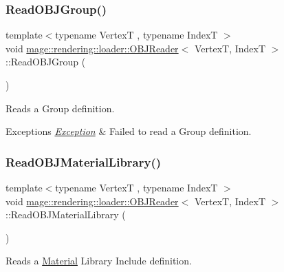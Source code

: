 \subsubsection{\texorpdfstring{Read\+O\+B\+J\+Group()}{ReadOBJGroup()}}
{\footnotesize\ttfamily template$<$typename VertexT , typename IndexT $>$ \\
void \mbox{\hyperlink{classmage_1_1rendering_1_1loader_1_1_o_b_j_reader}{mage\+::rendering\+::loader\+::\+O\+B\+J\+Reader}}$<$ VertexT, IndexT $>$\+::Read\+O\+B\+J\+Group (\begin{DoxyParamCaption}{ }\end{DoxyParamCaption})\hspace{0.3cm}{\ttfamily [private]}}

Reads a Group definition.


\begin{DoxyExceptions}{Exceptions}
{\em \mbox{\hyperlink{classmage_1_1_exception}{Exception}}} & Failed to read a Group definition. \\
\hline
\end{DoxyExceptions}
\mbox{\label{classmage_1_1rendering_1_1loader_1_1_o_b_j_reader_aa898eb5cac6a5e04b1da9329587a81cd}} 
\subsubsection{\texorpdfstring{Read\+O\+B\+J\+Material\+Library()}{ReadOBJMaterialLibrary()}}
{\footnotesize\ttfamily template$<$typename VertexT , typename IndexT $>$ \\
void \mbox{\hyperlink{classmage_1_1rendering_1_1loader_1_1_o_b_j_reader}{mage\+::rendering\+::loader\+::\+O\+B\+J\+Reader}}$<$ VertexT, IndexT $>$\+::Read\+O\+B\+J\+Material\+Library (\begin{DoxyParamCaption}{ }\end{DoxyParamCaption})\hspace{0.3cm}{\ttfamily [private]}}

Reads a \mbox{\hyperlink{classmage_1_1rendering_1_1_material}{Material}} Library Include definition.


